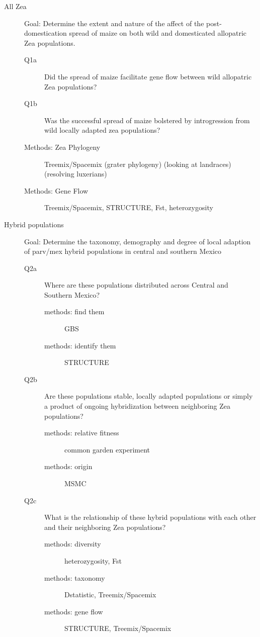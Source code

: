\documentclass[11pt]{amsart}
\begin{document}
\begin{description}
		\begin{description}
			\item[All Zea] Goal: Determine the extent and nature of the affect of the post-domestication spread of maize on both wild and domesticated allopatric Zea populations.
				\begin{description}
					\item[Q1a] Did the spread of maize facilitate gene flow between wild allopatric Zea populations?
					\item[Q1b]  Was the successful spread of maize bolstered by introgression from wild locally adapted zea populations?
					\item[Methods: Zea Phylogeny] Treemix/Spacemix (grater phylogeny) (looking at landraces) (resolving luxerians)
					\item[Methods: Gene Flow] Treemix/Spacemix, STRUCTURE, Fst, heterozygosity
				\end{description}
			\item[Hybrid populations] Goal: Determine the taxonomy, demography and degree of local adaption of parv/mex hybrid populations in central and southern Mexico
				\begin{description}
					\item[Q2a] Where are these populations distributed across Central and Southern Mexico?
						\begin{description}
							\item[methods: find them] GBS
							\item[methods: identify them] STRUCTURE
						\end{description}
					\item[Q2b] Are these populations stable, locally adapted populations or simply a product of ongoing hybridization between neighboring Zea populations?
						\begin{description}
							\item[methods: relative fitness] common garden experiment
							\item[methods: origin] MSMC
						\end{description}
					\item[Q2c] What is the relationship of these hybrid populations with each other and their neighboring Zea populations?
						\begin{description}
							\item[methods: diversity] heterozygosity, Fst
							\item[methods: taxonomy] Dstatistic, Treemix/Spacemix
							\item[methods: gene flow] STRUCTURE, Treemix/Spacemix

\end{description}
\end{description}
\end{description}
\end{description}
\end{document}
